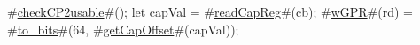 #\hyperref[sailMIPSzcheckCP2usable]{checkCP2usable}#();
let capVal = #\hyperref[sailMIPSzreadCapReg]{readCapReg}#(cb);
#\hyperref[sailMIPSzwGPR]{wGPR}#(rd) = #\hyperref[sailMIPSztozybits]{to\_bits}#(64, #\hyperref[sailMIPSzgetCapOffset]{getCapOffset}#(capVal));
